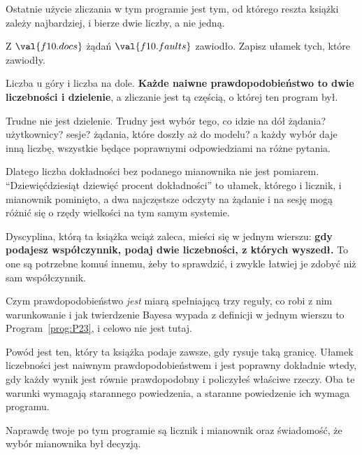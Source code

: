 \begin{fr}
Ostatnie użycie zliczania w tym programie jest tym, od którego reszta książki
zależy najbardziej, i bierze dwie liczby, a nie jedną.

Z $\val{f10.docs}$ żądań $\val{f10.faults}$ zawiodło. Zapisz ułamek tych, które
zawiodły.
\nextframe
\end{fr}

\begin{fr}
Liczba u góry i liczba na dole. \textbf{Każde naiwne prawdopodobieństwo to dwie
liczebności i dzielenie}, a zliczanie jest tą częścią, o której ten program
był.

Trudne nie jest dzielenie. Trudny jest wybór tego, co idzie na dół \dash{}
żądania? użytkownicy? sesje? żądania, które doszły aż do modelu? \dash{} a
każdy wybór daje inną liczbę, wszystkie będące poprawnymi odpowiedziami na
różne pytania.

\begin{aibox}
Dlatego liczba dokładności bez podanego mianownika nie jest pomiarem.
\enquote{Dziewięćdziesiąt dziewięć procent dokładności} to ułamek, którego i
licznik, i mianownik pominięto, a dwa najczęstsze odczyty \dash{} na żądanie i
na sesję \dash{} mogą różnić się o rzędy wielkości na tym samym systemie.

Dyscyplina, którą ta książka wciąż zaleca, mieści się w jednym wierszu:
\textbf{gdy podajesz współczynnik, podaj dwie liczebności, z których wyszedł.}
To one są potrzebne komuś innemu, żeby to sprawdzić, i zwykle łatwiej je zdobyć
niż sam współczynnik.
\end{aibox}
\end{fr}

\begin{fr}
Czym prawdopodobieństwo \emph{jest} \dash{} miarą spełniającą trzy reguły, co
robi z nim warunkowanie i jak twierdzenie Bayesa wypada z definicji w jednym
wierszu \dash{} to Program~\ref{prog:P23}, i celowo nie jest tutaj.

Powód jest ten, który ta książka podaje zawsze, gdy rysuje taką granicę. Ułamek
liczebności jest naiwnym prawdopodobieństwem i jest poprawny dokładnie wtedy,
gdy każdy wynik jest równie prawdopodobny i policzyłeś właściwe rzeczy. Oba te
warunki wymagają starannego powiedzenia, a staranne powiedzenie ich wymaga
programu.

Naprawdę twoje po tym programie są licznik i mianownik oraz świadomość, że
wybór mianownika był decyzją.
\end{fr}

